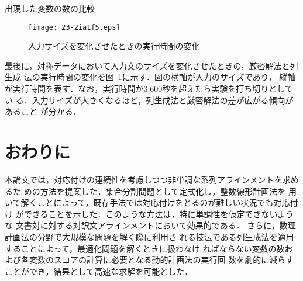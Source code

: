 \documentclass[japanese]{jnlp_1.4}
\begin{document}
\begin{table}[p]
\caption{出現した変数の数の比較}\label{tab:numval}

\end{table}
\begin{figure}[p]
\vspace{1\Cvs}
\begin{center}
\texttt{[image: 23-2ia1f5.eps]}
\end{center}
\caption{入力サイズを変化させたときの実行時間の変化}
\label{fig:runtime}
\end{figure}


最後に，対称データにおいて入力文のサイズを変化させたときの，厳密解法と列生成
法の実行時間の変化を図~\ref{fig:runtime}に示す．図の横軸が入力のサイズであり，
縦軸が実行時間を表す．なお，実行時間が3,600秒を超えたら実験を打ち切りとしてい
る．入力サイズが大きくなるほど，列生成法と厳密解法の差が広がる傾向があること
が分かる．



\section{おわりに}

本論文では，対応付けの連続性を考慮しつつ非単調な系列アラインメントを求めるた
めの方法を提案した．集合分割問題として定式化し，整数線形計画法を
用いて解くことによって，既存手法では対応付けをとるのが難しい状況でも対応付け
ができることを示した．このような方法は，特に単調性を仮定できないような
文書対に対する対訳文アラインメントにおいて効果的である．
さらに，数理計画法の分野で大規模な問題を解く際に利用さ
れる技法である列生成法を適用することによって，最適化問題を解くときに扱わなけ
ればならない変数の数および各変数のスコアの計算に必要となる動的計画法の実行回
数を劇的に減らすことができ，結果として高速な求解を可能とした．
\end{document}
